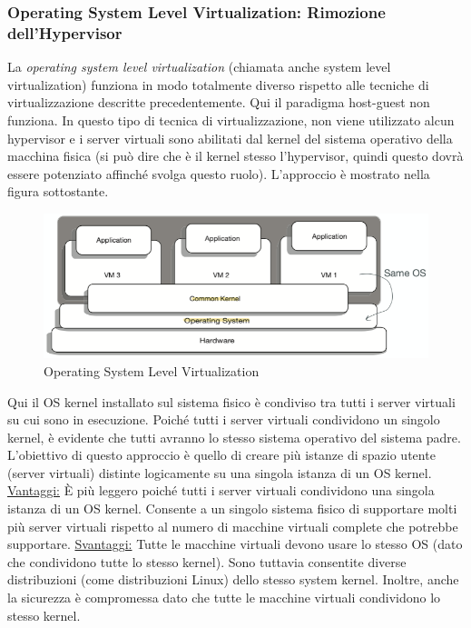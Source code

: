 \documentclass{article}
\begin{document}
\subsubsection{Operating System Level Virtualization: Rimozione dell’Hypervisor}
La \textit{operating system level virtualization} (chiamata anche system level virtualization) funziona in modo totalmente diverso rispetto alle tecniche di virtualizzazione descritte precedentemente. Qui il paradigma host-guest non funziona. In questo tipo di tecnica di virtualizzazione, non viene utilizzato alcun hypervisor e i server virtuali sono abilitati dal kernel del sistema operativo della macchina fisica (si può dire che è il kernel stesso l’hypervisor, quindi questo dovrà essere potenziato affinché svolga questo ruolo). L'approccio è mostrato nella figura sottostante.
\begin{figure}[H]
    \centering
    \includegraphics[scale=0.8]{img/operating system level.png}
    \caption{Operating System Level Virtualization}
\end{figure}\noindent
Qui il OS kernel installato sul sistema fisico è condiviso tra tutti i server virtuali su cui sono in esecuzione. Poiché tutti i server virtuali condividono un singolo kernel, è evidente che tutti avranno lo stesso sistema operativo del sistema padre. L'obiettivo di questo approccio è quello di creare più istanze di spazio utente (server virtuali) distinte logicamente su una singola istanza di un OS kernel. \\
\uline{Vantaggi:} È più leggero poiché tutti i server virtuali condividono una singola istanza di un OS kernel. Consente a un singolo sistema fisico di supportare molti più server virtuali rispetto al numero di macchine virtuali complete che potrebbe supportare.
\uline{Svantaggi:} Tutte le macchine virtuali devono usare lo stesso OS (dato che condividono tutte lo stesso kernel). Sono tuttavia consentite diverse distribuzioni (come distribuzioni Linux) dello stesso system kernel. Inoltre, anche la sicurezza è compromessa dato che tutte le macchine virtuali condividono lo stesso kernel.
\end{document}
